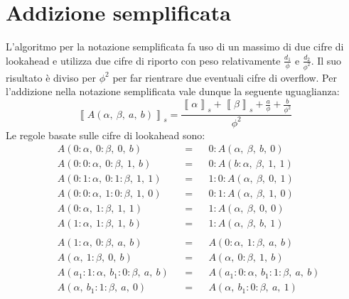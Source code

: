 \documentclass[Lau,oneside]{sapthesis}
\begin{document}
\section{Addizione semplificata}
L'algoritmo per la notazione semplificata fa uso di un massimo di due cifre di lookahead e utilizza due cifre di riporto con peso relativamente $\frac{d_1}{\phi}$ e $\frac{d_2}{\phi^2}$. Il suo risultato è diviso per $\phi^2$ per far rientrare due eventuali cifre di overflow. Per l'addizione nella notazione semplificata vale dunque la seguente uguaglianza:
$$\left\llbracket A(\alpha, \ \beta, \ a, \ b) \right\rrbracket_s = 
\frac{\left\llbracket \alpha \right\rrbracket_s + \left\llbracket \beta \right\rrbracket_s + \frac{a}{\phi} + \frac{b}{\phi^2}}{\phi^2}$$
Le regole basate sulle cifre di lookahead sono:
\begin{align*}
&A(0:\alpha, \ 0:\beta, \ 0, \ b) && = && 0:A(\alpha, \ \beta, \ b, \ 0)\\
&A(0:0:\alpha, \ 0:\beta, \ 1, \ b) && = && 0:A(b:\alpha, \ \beta, \ 1, \ 1)\\
&A(0:1:\alpha, \ 0:1:\beta, \ 1, \ 1) && = && 1:0:A(\alpha, \ \beta, \ 0, \ 1)\\
&A(0:0:\alpha, \ 1:0:\beta, \ 1, \ 0) && = && 0:1:A(\alpha, \ \beta, \ 1, \ 0)\\
&A(0:\alpha, \ 1:\beta, \ 1, \ 1) && = && 1:A(\alpha, \ \beta, \ 0, \ 0)\\
&A(1:\alpha, \ 1:\beta, \ 1, \ b) && = && 1:A(\alpha, \ \beta, \ b, \ 1)\\
\\
&A(1:\alpha, \ 0:\beta, \ a, \ b) && = && A(0:\alpha, \ 1:\beta, \ a, \ b)\\
&A(\alpha, \ 1:\beta, \ 0, \ b) && = && A(\alpha, \ 0:\beta, \ 1, \ b)\\
&A(a_1:1:\alpha, \ b_1:0:\beta, \ a, \ b) && = && A(a_1:0:\alpha, \ b_1:1:\beta, \ a, \ b)\\
&A(\alpha, \ b_1:1:\beta, \ a, \ 0) && = && A(\alpha, \ b_1:0:\beta, \ a, \ 1)
\end{align*}
\end{document}
